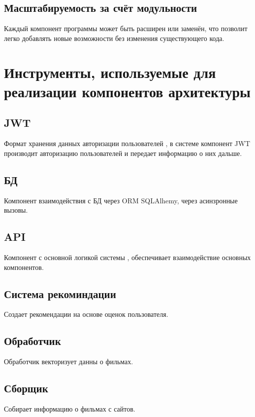 \subsection{Масштабируемость за счёт модульности}

Каждый компонент программы
может быть расширен или заменён,
что позволит легко добавлять новые возможности
без изменения существующего кода.

\section{Инструменты, используемые для реализации компонентов архитектуры}

\subsection{JWT}
Формат хранения данных авторизации пользователей , в системе компонент JWT производит авторизацию пользователей и
передает информацию о них дальше.

\subsection{БД}
Компонент взаимодействия с БД через ORM SQLAlhemy, через асинзронные вызовы.

\subsection{API}
Компонент с основной логикой системы , обеспечивает взаимодействие основных компонентов.

\subsection{Система рекоминдации}
Создает рекомендации на основе оценок пользователя.

\subsection{Обработчик}
Обработчик векторизует данны о фильмах.


\subsection{Сборщик}
Собирает информацию о фильмах с сайтов.

\clearpage

